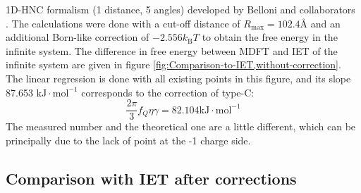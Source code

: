 1D-HNC formalism (1 distance, 5 angles) developed by Belloni and collaborators
\citep{belloni_efficient_2014}. The calculations were done with a
cut-off distance of $R_{\max}=102.4\textrm{Å}$ and an additional
Born-like correction of $-2.556k_{\mathrm{B}}T$ to obtain the free
energy in the infinite system. The difference in free energy between
\acs{MDFT} and \acs{IET} of the infinite system are given in figure
\ref{fig:Comparison-to-IET,without-correction}. The linear regression
is done with all existing points in this figure, and its slope 87.653
$\mathrm{kJ}\cdot\mathrm{mol^{-1}}$ corresponds to the correction
of type-C:
\begin{equation}
\dfrac{2\pi}{3}f_{Q}\eta\gamma=82.104\mathrm{kJ}\cdot\mathrm{mol^{-1}}\label{eq:eta-gamma}
\end{equation}
The measured number and the theoretical one are a little different,
which can be principally due to the lack of point at the -1 charge side.

\subsection{Comparison with IET after corrections}

